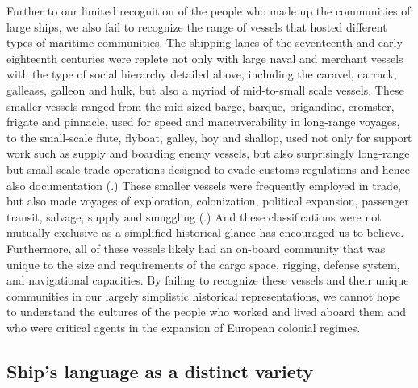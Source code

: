 Further to our limited recognition of the people who made up the communities of large ships, we also fail to recognize the range of vessels that hosted different types of maritime communities. The shipping lanes of the seventeenth and early eighteenth centuries were replete not only with large naval and merchant vessels with the type of social hierarchy detailed above, including the caravel, carrack, galleass, galleon and hulk, but also a myriad of mid-to-small scale vessels. These smaller vessels ranged from the mid-sized barge, barque, brigandine, cromster, frigate and pinnacle, used for speed and maneuverability in long-range voyages, to the small-scale flute, flyboat, galley, hoy and shallop, used not only for support work such as supply and boarding enemy vessels, but also surprisingly long-range but small-scale trade operations designed to evade customs regulations and hence also documentation (\citealt{Bicheno2012}.) These smaller vessels were frequently employed in trade, but also made voyages of exploration, colonization, political expansion, passenger transit, salvage, supply and smuggling (\citealt{Jarvis2010}.) And these classifications were not mutually exclusive as a simplified historical glance has encouraged us to believe. Furthermore, all of these vessels likely had an on-board community that was unique to the size and requirements of the cargo space, rigging, defense system, and navigational capacities. By failing to recognize these vessels and their unique communities in our largely simplistic historical representations, we cannot hope to understand the cultures of the people who worked and lived aboard them and who were critical agents in the expansion of European colonial regimes. 



\subsection{\textbf{Ship’s} \textbf{language} \textbf{as} \textbf{a} \textbf{distinct} \textbf{variety}}%



